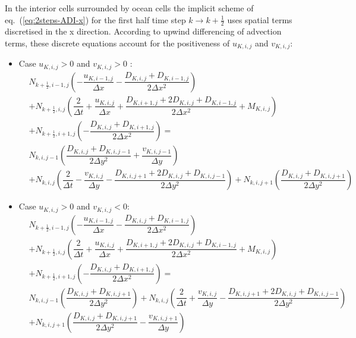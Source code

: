 In the interior cells surrounded by ocean cells the implicit scheme of eq.~(\ref{eq:2steps-ADI-x}) for the first half time step $k\to k+\frac{1}{2}$ uses spatial terms discretised in the x direction. According to upwind differencing of advection terms, these discrete equations account for the positiveness of $u_{K,i,j}$ and $v_{K,i,j}$:
\begin{itemize}
\item Case $u_{K,i,j}>0$ and $v_{K,i,j}>0$ :
\begin{align}
  \label{eq:2steps-ADI-x-upos-vpos}
  \nonumber
    &N_{k+\frac{1}{2},i-1,j}  \left(
    -\dfrac{u_{K,i-1,j}}{\Delta x}
    -\dfrac{D_{K,i,j}+D_{K,i-1,j}}{2\Delta x^2}
    \right)& \\\nonumber
    &+ N_{k+\frac{1}{2},i,j}  \left(
      \dfrac{2}{\Delta t} 
    +\dfrac{u_{K,i,j}}{\Delta x}
    +\dfrac{D_{K,i+1,j}+2D_{K,i,j}+D_{K,i-1,j}}{2\Delta x^2}
    + M_{K,i,j}    
    \right) \\\nonumber
    & + N_{k+\frac{1}{2},i+1,j} \left(
      -\dfrac{D_{K,i,j}+D_{K,i+1,j}}{2\Delta x^2}
    \right) = \\
    &N_{k,i,j-1}\left(\dfrac{D_{K,i,j}+D_{K,i,j-1}}{2\Delta y^2}+\dfrac{v_{K,i,j-1}}{\Delta y}\right)\\\nonumber
    &+ N_{k,i,j}\left(\dfrac{2}{\Delta t}-\dfrac{v_{K,i,j}}{\Delta y}-\dfrac{D_{K,i,j+1}+2D_{K,i,j}+D_{K,i,j-1}}{2\Delta y^2} \right)
    + N_{k,i,j+1}\left(\dfrac{D_{K,i,j}+D_{K,i,j+1}}{2\Delta y^2}\right)
\end{align}
\item Case $u_{K,i,j}>0$ and $v_{K,i,j}<0$:
\begin{align}
  \label{eq:2steps-ADI-x-upos-vneg}
  \nonumber
    &N_{k+\frac{1}{2},i-1,j}  \left(
    -\dfrac{u_{K,i-1,j}}{\Delta x}
    -\dfrac{D_{K,i,j}+D_{K,i-1,j}}{2\Delta x^2}
    \right)& \\\nonumber
    &+ N_{k+\frac{1}{2},i,j}  \left(
      \dfrac{2}{\Delta t} 
    +\dfrac{u_{K,i,j}}{\Delta x}
    +\dfrac{D_{K,i+1,j}+2D_{K,i,j}+D_{K,i-1,j}}{2\Delta x^2}
    + M_{K,i,j}    
    \right) \\\nonumber
    & + N_{k+\frac{1}{2},i+1,j} \left(
      -\dfrac{D_{K,i,j}+D_{K,i+1,j}}{2\Delta x^2}
    \right) 
    = \\
    \nonumber
    &N_{k,i,j-1}\left(\dfrac{D_{K,i,j}+D_{K,i,j+1}}{2\Delta y^2}\right)
    + N_{k,i,j}\left(\dfrac{2}{\Delta t}+\dfrac{v_{K,i,j}}{\Delta y}-\dfrac{D_{K,i,j+1}+2D_{K,i,j}+D_{K,i,j-1}}{2\Delta y^2} \right)\\
    &+N_{k,i,j+1}\left(\dfrac{D_{K,i,j}+D_{K,i,j+1}}{2\Delta y^2}-\dfrac{v_{K,i,j+1}}{\Delta y}\right)

\end{align}
\end{itemize}
